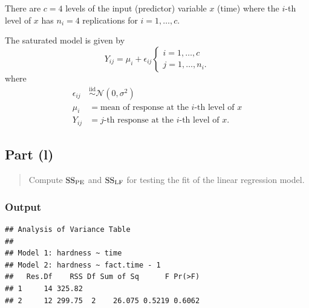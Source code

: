 \documentclass[
]{article}
\newenvironment{Shaded}{\begin{snugshade}}{\end{snugshade}}
\newcommand{\AttributeTok}[1]{\textcolor[rgb]{0.13,0.29,0.53}{#1}}
\newcommand{\DecValTok}[1]{\textcolor[rgb]{0.00,0.00,0.81}{#1}}
\newcommand{\FunctionTok}[1]{\textcolor[rgb]{0.13,0.29,0.53}{\textbf{#1}}}
\newcommand{\NormalTok}[1]{#1}
\newcommand{\OtherTok}[1]{\textcolor[rgb]{0.56,0.35,0.01}{#1}}
\newcommand{\SpecialCharTok}[1]{\textcolor[rgb]{0.81,0.36,0.00}{\textbf{#1}}}
\begin{document}
There are \(c=4\) levels of the input (predictor) variable \(x\) (time)
where the \(i\)-th level of \(x\) has \(n_i = 4\) replications for
\(i=1,\ldots,c\).

The saturated model is given by \[
  Y_{i j} = \mu_i + \epsilon_{i j}
  \begin{cases}
    i = 1,\ldots,c\\
    j = 1,\ldots,n_i.
  \end{cases}
\] where \begin{align*}
  \epsilon_{i j} &\overset{\text{iid}}{\sim} \mathcal{N}(0,\sigma^2)\\
  \mu_i          &= \text{mean of response at the $i$-th level of $x$}\\
  Y_{i j}        &= \text{$j$-th response at the $i$-th level of $x$}.
\end{align*}

\hypertarget{part-l}{%
\subsection{Part (l)}\label{part-l}}

\begin{quote}
Compute \(\mathrm{SS_{PE}}\) and \(\mathrm{SS_{LF}}\) for testing the fit of the linear
regression model.
\end{quote}

\hypertarget{output-5}{%
\subsubsection{Output}\label{output-5}}

\begin{Shaded}
\end{Shaded}

\begin{verbatim}
## Analysis of Variance Table
## 
## Model 1: hardness ~ time
## Model 2: hardness ~ fact.time - 1
##   Res.Df    RSS Df Sum of Sq      F Pr(>F)
## 1     14 325.82                           
## 2     12 299.75  2    26.075 0.5219 0.6062
\end{verbatim}
\end{document}
